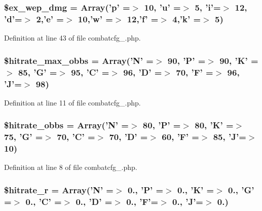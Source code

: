 \hypertarget{combatcfg__1_8php_aa25b77d6ee7c1987c1b4b887c53bab71}{
\subsubsection[{\$ex\+\_\+wep\+\_\+dmg}]{\setlength{\rightskip}{0pt plus 5cm}\$ex\+\_\+wep\+\_\+dmg = Array('p' =$>$ 10, 'u' =$>$ 5, 'i'=$>$ 12, 'd'=$>$ 2,'e' =$>$ 10,'w' =$>$ 12,'f' =$>$ 4,'k' =$>$ 5)}}\label{combatcfg__1_8php_aa25b77d6ee7c1987c1b4b887c53bab71}


Definition at line 43 of file combatcfg\+\_.\+php.

\hypertarget{combatcfg__1_8php_a6d9d26fbeeefc20aa46ea345bcb5ed51}{
\subsubsection[{\$hitrate\+\_\+max\+\_\+obbs}]{\setlength{\rightskip}{0pt plus 5cm}\$hitrate\+\_\+max\+\_\+obbs = Array('N' =$>$ 90, 'P' =$>$ 90, 'K' =$>$ 85, 'G' =$>$ 95, 'C' =$>$ 96, 'D' =$>$ 70, 'F' =$>$ 96, 'J'=$>$ 98)}}\label{combatcfg__1_8php_a6d9d26fbeeefc20aa46ea345bcb5ed51}


Definition at line 11 of file combatcfg\+\_.\+php.

\hypertarget{combatcfg__1_8php_ac675dd97339f167860b7465a8af386bd}{
\subsubsection[{\$hitrate\+\_\+obbs}]{\setlength{\rightskip}{0pt plus 5cm}\$hitrate\+\_\+obbs = Array('N' =$>$ 80, 'P' =$>$ 80, 'K' =$>$ 75, 'G' =$>$ 70, 'C' =$>$ 70, 'D' =$>$ 60, 'F' =$>$ 85, 'J'=$>$ 10)}}\label{combatcfg__1_8php_ac675dd97339f167860b7465a8af386bd}


Definition at line 8 of file combatcfg\+\_.\+php.

\hypertarget{combatcfg__1_8php_a456845a4c14b252134d57fd130706f9d}{
\subsubsection[{\$hitrate\+\_\+r}]{\setlength{\rightskip}{0pt plus 5cm}\$hitrate\+\_\+r = Array('N' =$>$ 0., 'P' =$>$ 0., 'K' =$>$ 0., 'G' =$>$ 0., 'C' =$>$ 0., 'D' =$>$ 0., 'F'=$>$ 0., 'J'=$>$ 0.)}}\label{combatcfg__1_8php_a456845a4c14b252134d57fd130706f9d}


